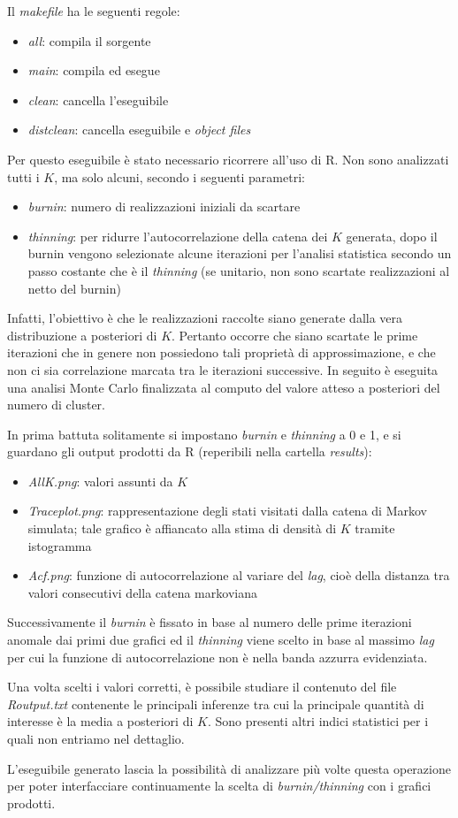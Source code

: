 \documentclass[a4paper,12pt]{report}							%
\begin{document}
Il \textit{makefile} ha le seguenti regole:
\begin{itemize}
 \item \textit{all}: compila il sorgente
 \item \textit{main}: compila ed esegue
 \item \textit{clean}: cancella l'eseguibile
 \item \textit{distclean}: cancella eseguibile e \textit{object files}
\end{itemize}
Per questo eseguibile è stato necessario ricorrere all'uso di R. Non sono analizzati tutti i $K$, ma solo alcuni, 
secondo i seguenti parametri:
\begin{itemize}
 \item \textit{burnin}: numero di realizzazioni iniziali da scartare 
 \item \textit{thinning}: per ridurre l'autocorrelazione della catena dei $K$ generata, dopo il burnin vengono selezionate 
 alcune iterazioni per l'analisi statistica secondo un passo costante che è il \textit{thinning} 
 (se unitario, non sono scartate realizzazioni al netto del burnin)
\end{itemize}
Infatti, l'obiettivo è che le realizzazioni raccolte siano generate dalla vera distribuzione a posteriori di $K$.
Pertanto occorre che siano scartate le prime iterazioni che in genere non possiedono tali proprietà di approssimazione, 
e che non ci sia correlazione marcata tra le iterazioni successive. In seguito è eseguita una analisi Monte Carlo finalizzata
al computo del valore atteso a posteriori del numero di cluster.

In prima battuta solitamente si impostano \textit{burnin} e \textit{thinning} a 0 e 1, 
e si guardano gli output prodotti
da R (reperibili nella cartella \textit{results}):
\begin{itemize}
 \item \textit{AllK.png}: valori assunti da $K$
 \item \textit{Traceplot.png}: rappresentazione degli stati visitati dalla catena di Markov simulata; tale grafico è 
 affiancato alla stima di densità di $K$ tramite istogramma
 \item \textit{Acf.png}: funzione di autocorrelazione al variare del \textit{lag}, cioè della distanza tra valori consecutivi
 della catena markoviana
\end{itemize}

Successivamente il \textit{burnin} è fissato in base al numero delle prime iterazioni anomale dai primi due grafici ed 
il \textit{thinning} viene scelto in base al massimo \textit{lag} per cui la funzione
di autocorrelazione non è nella banda azzurra evidenziata.

Una volta scelti i valori corretti, è possibile studiare il contenuto del file \textit{Routput.txt} contenente le principali 
inferenze tra cui la principale quantità di interesse è la media a posteriori di $K$. Sono presenti altri indici statistici per i quali non entriamo 
nel dettaglio.

L'eseguibile generato lascia la possibilità di analizzare più volte questa operazione per poter interfacciare continuamente
la scelta di \textit{burnin/thinning} con i grafici prodotti.
\end{document}
